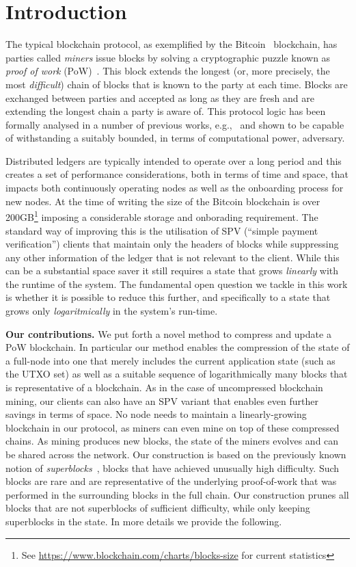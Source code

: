 \section{Introduction}

The typical blockchain protocol, as exemplified by the Bitcoin~\cite{bitcoin}
blockchain, has parties called \emph{miners} issue blocks by solving a cryptographic
puzzle known as \emph{proof of work} (PoW)~\cite{C:DwoNao92}. This block extends
the longest (or, more precisely, the most \emph{difficult}) chain of blocks that
is known to the party at each time. Blocks are exchanged between parties and
accepted as long as they are fresh and are extending the longest chain a party
is aware of. This protocol logic has been formally analysed in a number of
previous works,
e.g.,~\cite{EC:GarKiaLeo15,C:GarKiaLeo17,DBLP:conf/eurocrypt/PassSS17,DBLP:conf/crypto/BadertscherMTZ17}
and shown to be capable of withstanding a suitably bounded, in terms of
computational power, adversary.


Distributed ledgers are typically intended to operate over a long period
and this creates a set of performance considerations,
both in terms of time and space, that impacts both
continuously operating nodes as well as the onboarding process for new nodes.
At the time of writing the size of the Bitcoin blockchain is
over 200GB\footnote{See \url{https://www.blockchain.com/charts/blocks-size} for
current statistics} imposing a considerable storage and onborading requirement.
The standard way of improving this is the utilisation of SPV (``simple payment
verification'') clients that maintain only the headers of blocks
while suppressing any other information of the ledger that is not relevant to
the client. While this can be a substantial space saver it still requires a
state that grows {\em linearly} with the runtime of the system. The fundamental
open question we tackle in this work is whether it is possible to reduce this
further, and specifically to a state that grows only {\em logaritmically} in the
system's run-time.

{\bf  Our contributions.} We put forth a novel method to compress and update
a PoW blockchain. In particular our method enables the compression of
the state of a full-node into one that merely includes
the current application state (such as the UTXO set) as well as a suitable sequence of logarithmically many
blocks that
is representative of a blockchain. As in the case
of uncompressed blockchain mining, our clients can also have an SPV
variant that enables even further savings in terms of space.
No node needs to maintain a linearly-growing blockchain in our protocol, as
miners can even mine on top of these compressed chains. As mining produces new
blocks, the state of the miners evolves and can be shared across the network.
Our construction is based on the previously known notion of \emph{superblocks}~\cite{popow,nipopows,compactsuperblocks},
blocks that have achieved unusually high difficulty. Such blocks are rare and
are representative of the underlying proof-of-work that was performed in the
surrounding blocks in the full chain. Our construction prunes all blocks that
are not superblocks of sufficient difficulty, while only keeping superblocks in
the state.
In more details we provide the following.

